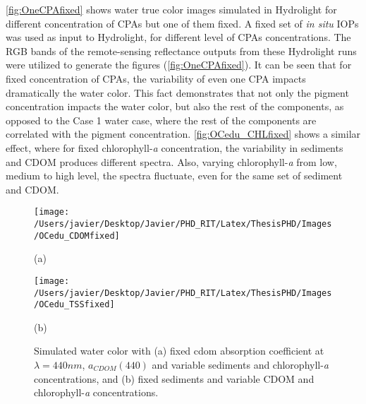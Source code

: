 \autoref{fig:OneCPAfixed} shows water true color images simulated in Hydrolight for different concentration of CPAs but one of them fixed. A fixed set of {\it in situ} IOPs was used as input to Hydrolight, for different level of CPAs concentrations. The RGB bands of the remote-sensing reflectance outputs from these Hydrolight runs were utilized to generate the figures (\autoref{fig:OneCPAfixed}). It can be seen that for fixed concentration of CPAs, the variability of even one CPA impacts dramatically the water color. This fact demonstrates that not only the pigment concentration impacts the water color, but also the rest of the components, as opposed to the Case 1 water case, where the rest of the components are correlated with the pigment concentration. \autoref{fig:OCedu_CHLfixed} shows a similar effect, where for fixed chlorophyll-{\it a} concentration, the variability in sediments and CDOM produces different spectra. Also, varying chlorophyll-{\it a} from low, medium to high level, the spectra fluctuate, even for the same set of sediment and CDOM. 
\begin{figure}[htb]
  \begin{minipage}[c]{0.48\linewidth}
    \centering
      \texttt{[image: /Users/javier/Desktop/Javier/PHD\_RIT/Latex/ThesisPHD/Images/OCedu\_CDOMfixed]}\\
      \centerline{(a)}\medskip
  \end{minipage}     
      \hfill
  \begin{minipage}[c]{0.48\linewidth}
    \centering
      \texttt{[image: /Users/javier/Desktop/Javier/PHD\_RIT/Latex/ThesisPHD/Images/OCedu\_TSSfixed]}\\
      \centerline{(b)}\medskip
  \end{minipage}
      \caption{Simulated water color with (a) fixed \gls{cdom} absorption coefficient at $\lambda=440nm$, $a_{CDOM}(440)$ and variable sediments and chlorophyll-{\it a} concentrations, and (b) fixed sediments and variable CDOM and chlorophyll-{\it a} concentrations.\label{fig:OneCPAfixed}}
\end{figure}

